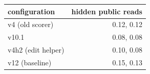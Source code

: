 \begin{tabular}{lr}
\toprule
configuration & hidden public reads \\
\midrule
v4 (old scorer) & 0.12, 0.12 \\
v10.1 & 0.08, 0.08 \\
v4h2 (edit helper) & 0.10, 0.08 \\
v12 (baseline) & 0.15, 0.13 \\
\bottomrule
\end{tabular}

